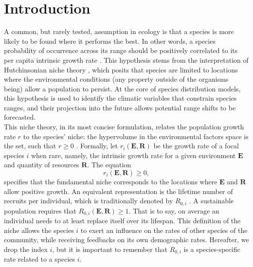

\section{Introduction}

A common, but rarely tested, assumption in ecology is that a species is more likely to be found where it performs the best. In other words, a species probability of occurrence across its range should be positively correlated to its per capita intrinsic growth rate \citep{McGill2012}. This hypothesis stems from the interpretation of Hutchinsonian niche theory \citep{Hutchinson1957, Maguire1973}, which posits that species are limited to locations where the environmental conditions (\ie any property outside of the organisms being) allow a population to persist. At the core of species distribution models, this hypothesis is used to identify the climatic variables that constrain species ranges, and their projection into the future allows potential range shifts to be forecasted. \\

This niche theory, in its most concise formulation, relates the population growth rate $ r $ to the species' niche: the hypervolume in the environmental factors space is the set, such that $ r \geqslant 0 $ \citep{Holt2009, Godsoe2017}. Formally, let $ r_i(\bm{E}, \bm{R}) $ be the growth rate of a focal species $ i $ when rare, namely, the intrinsic growth rate for a given environment $ \bm{E} $ and quantity of resources $ \bm{R} $. The equation
\[
	r_i(\bm{E}, \bm{R}) \geqslant 0,
\]
specifies that the fundamental niche corresponds to the locations where $ \bm{E} $ and $ \bm{R} $ allow positive growth. An equivalent representation is the lifetime number of recruits per individual, which is traditionally denoted by $ R_{0, i} $ \citep[where $ i $ is still the species index]{Pulliam2000, DeRoos1997}. A sustainable population requires that $ R_{0, i} (\bm{E}, \bm{R}) \geqslant 1 $. That is to say, on average an individual needs to at least replace itself over its lifespan. This definition of the niche allows the species $ i $ to exert an influence on the rates of other species of the community, while receiving feedbacks on its own demographic rates. Hereafter, we drop the index $ i $, but it is important to remember that $ R_{0, i} $ is a species-specific rate related to a species $ i $. \\

